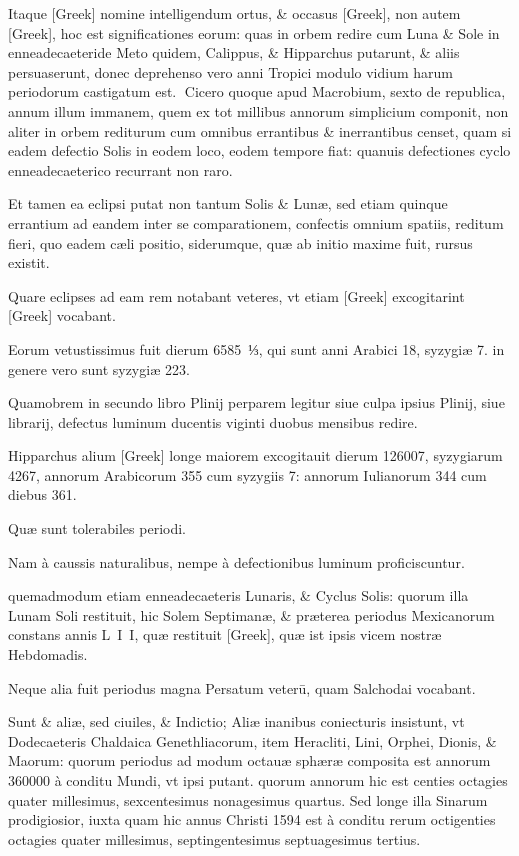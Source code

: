 \begin{parnumbers}

Itaque \textgreek{[Greek]} nomine intelligendum ortus, \& occasus \textgreek{[Greek]},  non autem \textgreek{[Greek]}, hoc est significationes eorum: quas in orbem redire cum Luna \& Sole in enneadecaeteride Meto quidem, Calippus, \& Hipparchus putarunt, \& aliis persuaserunt, donec deprehenso vero anni Tropici modulo vidium harum periodorum castigatum est.
Cicero quoque apud Macrobium, sexto de republica, annum illum immanem, quem ex tot millibus annorum simplicium componit, non aliter in orbem rediturum cum omnibus errantibus \& inerrantibus censet, quam si eadem defectio Solis in eodem loco, eodem tempore fiat: quanuis defectiones cyclo enneadecaeterico recurrant non raro.

Et tamen ea eclipsi putat non tantum Solis \& Lunæ, sed etiam quinque errantium ad eandem  inter se comparationem, confectis omnium spatiis, reditum fieri, quo eadem cæli positio, siderumque, quæ ab initio maxime fuit, rursus existit.

Quare eclipses ad eam rem notabant veteres, vt etiam \textgreek{[Greek]} excogitarint \textgreek{[Greek]} vocabant.

Eorum vetustissimus fuit dierum 6585 ⅓, qui sunt anni Arabici 18, syzygiæ 7. in genere vero sunt syzygiæ 223.

Quamobrem in secundo libro Plinij perparem legitur siue culpa ipsius Plinij, siue librarij, defectus luminum ducentis viginti duobus mensibus redire.

Hipparchus alium \textgreek{[Greek]} longe maiorem excogitauit dierum 126007, syzygiarum 4267, annorum Arabicorum 355 cum syzygiis 7: annorum Iulianorum 344 cum diebus 361.

Quæ sunt tolerabiles periodi.

Nam à caussis naturalibus,  nempe à defectionibus luminum proficiscuntur.

quemadmodum etiam enneadecaeteris Lunaris, \& Cyclus Solis: quorum illa Lunam Soli restituit, hic Solem Septimanæ, \& præterea periodus Mexicanorum constans annis L I I, quæ restituit \textgreek{[Greek]}, quæ ist ipsis vicem nostræ Hebdomadis.

Neque alia fuit periodus magna Persatum veterū, quam Salchodai vocabant.

Sunt \& aliæ, sed ciuiles, \& Indictio; Aliæ inanibus coniecturis insistunt, vt Dodecaeteris Chaldaica Genethliacorum, item Heracliti, Lini, Orphei, Dionis, \& Maorum: quorum periodus ad modum octauæ sphæræ composita est annorum 360000 à conditu Mundi, vt ipsi putant. quorum annorum hic est centies octagies quater millesimus, sexcentesimus nonagesimus quartus.  Sed longe illa Sinarum prodigiosior, iuxta quam hic annus Christi 1594 est à conditu rerum octigenties octagies quater millesimus, septingentesimus septuagesimus tertius.


\end{parnumbers}
